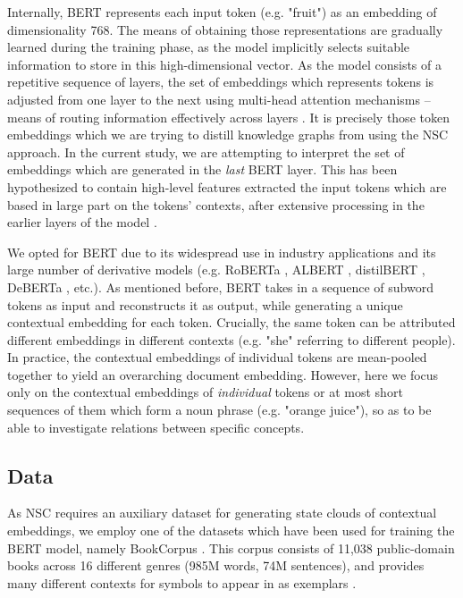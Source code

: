Internally, BERT represents each input token (e.g. "fruit") as an embedding of dimensionality 768. The means of obtaining those representations are gradually learned during the training phase, as the model implicitly selects suitable information to store in this high-dimensional vector. As the model consists of a repetitive sequence of layers, the set of embeddings which represents tokens is adjusted from one layer to the next using multi-head attention mechanisms -- means of routing information effectively across layers \citep{bahdanau_neural_2016}. It is precisely those token embeddings which we are trying to distill knowledge graphs from using the NSC approach. In the current study, we are attempting to interpret the set of embeddings which are generated in the \textit{last} BERT layer. This has been hypothesized to contain high-level features extracted the input tokens which are based in large part on the tokens' contexts, after extensive processing in the earlier layers of the model \citep{tenney_bert_2019}.

We opted for BERT due to its widespread use in industry applications and its large number of derivative models (e.g. RoBERTa \citep{liu_roberta_2019}, ALBERT \citep{lan_albert_2020}, distilBERT \citep{sanh_distilbert_2020}, DeBERTa \citep{he_deberta_2021}, etc.). As mentioned before, BERT takes in a sequence of subword tokens as input and reconstructs it as output, while generating a unique contextual embedding for each token. Crucially, the same token can be attributed different embeddings in different contexts (e.g. "she" referring to different people). In practice, the contextual embeddings of individual tokens are mean-pooled together to yield an overarching document embedding. However, here we focus only on the contextual embeddings of \textit{individual} tokens or at most short sequences of them which form a noun phrase (e.g. "orange juice"), so as to be able to investigate relations between specific concepts.

\subsection{Data}

As NSC requires an auxiliary dataset for generating state clouds of contextual embeddings, we employ one of the datasets which have been used for training the BERT model, namely BookCorpus \citep{devlin_bert_nodate}. This corpus consists of 11,038 public-domain books across 16 different genres (985M words, 74M sentences), and provides many different contexts for symbols to appear in as exemplars \citep{Zhu2015AligningBA}.

